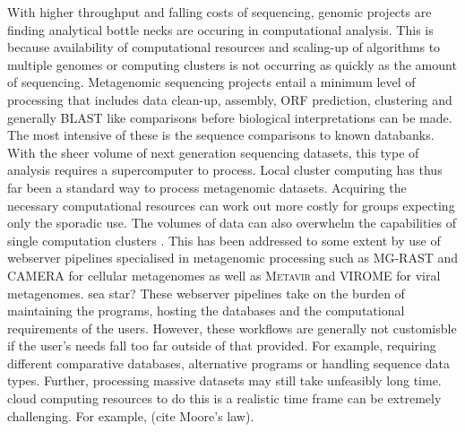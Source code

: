 With higher throughput and falling costs of sequencing, genomic projects are finding analytical bottle necks are occuring in computational analysis.
This is because availability of computational resources and scaling-up of algorithms to multiple genomes or computing clusters is not occurring as quickly as the amount of sequencing.
Metagenomic sequencing projects entail a minimum level of processing that includes data clean-up, assembly, \ac{ORF} prediction, clustering and generally \ac{BLAST} like comparisons before biological interpretations can be made.
The most intensive of these is the sequence comparisons to known databanks.
With the sheer volume of next generation sequencing datasets, this type of analysis requires a supercomputer to process.
Local cluster computing has thus far been a standard way to process metagenomic datasets. 
Acquiring the necessary computational resources can work out more costly for groups expecting only the sporadic use.
The volumes of data can also overwhelm the capabilities of single computation clusters \cite{Iverson2012}.
This has been addressed to some extent by use of webserver pipelines specialised in metagenomic processing such as \ac{MG-RAST} \cite{Meyer2008} and \ac{CAMERA} \cite{Sun2011} for cellular metagenomes as well as \textsc{Metavir} \cite{Roux2011} and \textsc{VIROME} \cite{Wommack2012} for viral metagenomes. sea star?
These webserver pipelines take on the burden of maintaining the programs, hosting the databases and the computational requirements of the users.
However, these workflows are generally not customisble if the user's needs fall too far outside of that provided. 
For example, requiring different comparative databases, alternative programs or handling sequence data types.
Further, processing massive datasets may still take unfeasibly long time.
cloud computing resources \cite{}
to do this is a realistic time frame can be extremely challenging.
For example, (cite Moore's law).



